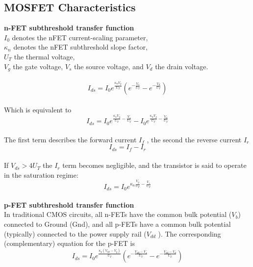 \documentclass[english,11pt]{article}
\begin{document}
\subsection{MOSFET Characteristics}
\textbf{n-FET subthreshold transfer function}\\
$I_0$ denotes the nFET current-scaling parameter,\\$\kappa_n$ denotes the nFET subthreshold slope factor,\\$U_T$ the thermal voltage,\\
$V_g$ the gate voltage, $V_s$ the source voltage, and $V_d$ the drain voltage.\\\\
\begin{equation}
I_{ds} = I_0 e^{\frac{\kappa_n V_g}{U_T}}(e^{-\frac{V_s}{U_T}}-e^{-\frac{V_d}{U_T}})
\end{equation}\\
Which is equivalent to\\
\begin{equation}
I_{ds} = I_0 e^{ \frac{\kappa_n V_g}{U_T}-\frac{V_s}{U_T}} - I_0 e^{ \frac{\kappa_n V_g}{U_T}-\frac{V_d}{U_T}}
\end{equation}\\
The first term describes the forward current $I_f$ , the second the reverse current $I_r$\\
\begin{equation}
I_{ds} = I_f - I_r
\end{equation}\\
If $V_{ds} > 4U_T$ the $I_r$ term becomes negligible, and the transistor is said to operate in the saturation regime:\\
\begin{equation}
I_{ds} = I_0 e^{\kappa_n \frac{V_g}{U_T}-\frac{V_s}{U_T}}
\end{equation}\\
\textbf{p-FET subthreshold transfer function}\\
In traditional CMOS circuits, all n-FETs have the common bulk potential ($V_b$) connected to Ground (Gnd), and all p-FETs have a common bulk potential
(typically) connected to the power supply rail ($V_{dd}$ ).
The corresponding (complementary) equation for the p-FET is\\
\begin{equation}
I_{ds} = I_0 e^{\frac{\kappa_p (V_{dd} - V_g)}{U_T}}(e^{-\frac{V_{dd}-V_s}{U_T}}-e^{-\frac{V_{dd}-V_d}{U_T}})
\end{equation}\\
\end{document}
